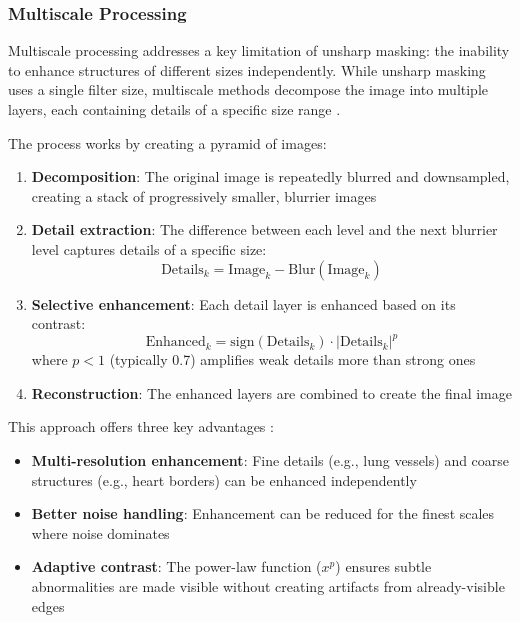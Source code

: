 \documentclass[nomenclature, english, bibtex]{kththesis}
\numberwithin{listing}{chapter}
\begin{document}
\subsubsection{Multiscale Processing}

Multiscale processing addresses a key limitation of unsharp masking: the inability to enhance structures of different sizes independently. While unsharp masking uses a single filter size, multiscale methods decompose the image into multiple layers, each containing details of a specific size range \cite{vuylstekeMultiscaleImageContrast1994}.

The process works by creating a pyramid of images:

\begin{enumerate}
    \item \textbf{Decomposition}: The original image is repeatedly blurred and downsampled, creating a stack of progressively smaller, blurrier images
    \item \textbf{Detail extraction}: The difference between each level and the next blurrier level captures details of a specific size:
    \begin{equation}
    \text{Details}_k = \text{Image}_k - \text{Blur}(\text{Image}_k)
    \end{equation}
    \item \textbf{Selective enhancement}: Each detail layer is enhanced based on its contrast:
    \begin{equation}
    \text{Enhanced}_k = \text{sign}(\text{Details}_k) \cdot |\text{Details}_k|^p
    \end{equation}
    where $p < 1$ (typically 0.7) amplifies weak details more than strong ones
    \item \textbf{Reconstruction}: The enhanced layers are combined to create the final image
\end{enumerate}

This approach offers three key advantages \cite{Prokop2003,STA00a}:
\begin{itemize}
    \item \textbf{Multi-resolution enhancement}: Fine details (e.g., lung vessels) and coarse structures (e.g., heart borders) can be enhanced independently
    \item \textbf{Better noise handling}: Enhancement can be reduced for the finest scales where noise dominates
    \item \textbf{Adaptive contrast}: The power-law function ($x^p$) ensures subtle abnormalities are made visible without creating artifacts from already-visible edges
\end{itemize}
\end{document}
